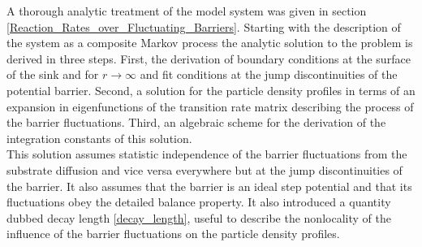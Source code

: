 A thorough analytic treatment of the model system was given in section \ref{Reaction_Rates_over_Fluctuating_Barriers}. Starting with the description of the system as a composite Markov process the analytic solution to the problem is derived in three steps. First, the derivation of boundary conditions at the surface of the sink and for $r \rightarrow \infty$ and fit conditions at the jump discontinuities of the potential barrier. Second, a solution for the particle density profiles in terms of an expansion in eigenfunctions of the transition rate matrix describing the process of the barrier fluctuations. Third, an algebraic scheme for the derivation of the integration constants of this solution. \\
This solution assumes statistic independence of the barrier fluctuations from the substrate diffusion and vice versa everywhere but at the jump discontinuities of the barrier. It also assumes that the barrier is an ideal step potential and that its fluctuations obey the detailed balance property. It also introduced a quantity dubbed decay length \eqref{decay_length}, useful to describe the nonlocality of the influence of the barrier fluctuations on the particle density profiles.\\

